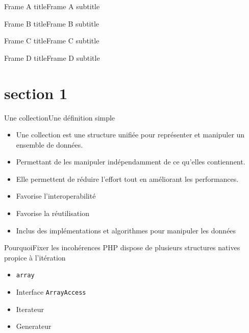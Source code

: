 





\begin{frame}[plain]
	\titlepage{}
\end{frame}

\begin{frameA}{Frame A title}{Frame A subtitle}
\end{frameA}

\begin{frameB}{Frame B title}{Frame B subtitle}
\end{frameB}

\begin{frameC}{Frame C title}{Frame C subtitle}
\end{frameC}

\begin{frameD}{Frame D title}{Frame D subtitle}
\end{frameD}

\section{section 1}
\begin{frame}{Une collection}{Une définition simple}
    \begin{itemize}
        \item Une collection est une structure unifiée pour représenter et manipuler un ensemble de données.
        \item Permettant de les manipuler indépendamment de ce qu'elles contiennent.
        \item Elle permettent de réduire l'effort tout en améliorant les performances\footnotemark.
        \item Favorise l'interoperabilité
        \item Favorise la réutilisation
        \item Inclus des implémentations et algorithmes pour manipuler les données
    \end{itemize}

\end{frame}

\begin{frame}{Pourquoi}{Fixer les incohérences}
    PHP dispose de plusieurs structures natives propice à l'itération

    \begin{itemize}[<+->]
        \item \texttt{array}
        \item Interface \texttt{ArrayAccess}
        \item Iterateur
        \item Generateur
    \end{itemize}
\end{frame}

